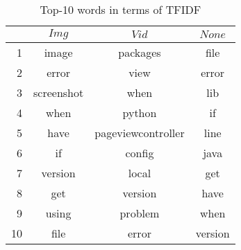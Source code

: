 \begin{table}[t]
  \begin{center}
  \caption{Top-10 words in terms of TFIDF}
  \begin{tabular}{r | c c c}
    \hline
     & $Img$ & $Vid$ & $None$\\
    \hline
    1 & image & packages & file\\
    2 & error & view & error\\
    3 & screenshot & when & lib\\
    4 & when & python & if\\
    5 & have & pageviewcontroller & line\\
    6 & if & config & java \\
    7 & version & local & get\\
    8 & get & version & have\\
    9 & using & problem & when\\
    10& file & error & version\\
    \hline
  \end{tabular}\\
  \label{tab:tfidf-result}
  \end{center}
\end{table}
